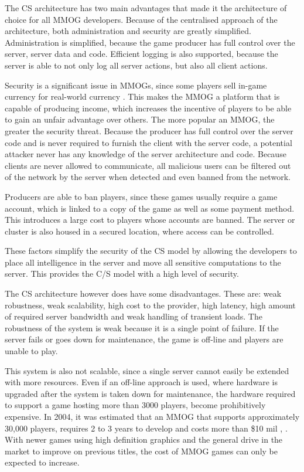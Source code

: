 \documentclass[journal,oneside,a4paper,onecolumn]{IEEEtran}
\begin{document}
The \ac{CS} architecture has two main advantages that made it the architecture of choice for all MMOG developers. Because of the centralised approach of the architecture, both administration and security are greatly simplified. Administration is simplified, because the game producer has full control over the server, server data and code. Efficient logging is also supported, because the server is able to not only log all server actions, but also all client actions.

Security is a significant issue in MMOGs, since some players sell in-game currency for real-world currency \cite{chinese_gold_farmer}. This makes the MMOG a platform that is capable of producing income, which increases the incentive of players to be able to gain an unfair advantage over others. The more popular an MMOG, the greater the security threat. Because the producer has full control over the server code and is never required to furnish the client with the server code, a potential attacker never has any knowledge of the server architecture and code. Because clients are never allowed to communicate, all malicious users can be filtered out of the network by the server when detected and even banned from the network.

Producers are able to ban players, since these games usually require a game account, which is linked to a copy of the game as well as some payment method. This introduces a large cost to players whose accounts are banned. The server or cluster is also housed in a secured location, where access can be controlled.

These factors simplify the security of the \ac{CS} model by allowing the developers to place all intelligence in the server and move all sensitive computations to the server. This provides the C/S model with a high level of security.

The \ac{CS} architecture however does have some disadvantages. These are: weak robustness, weak scalability, high cost to the provider, high latency, high amount of required server bandwidth and weak handling of transient loads. The robustness of the system is weak because it is a single point of failure. If the server fails or goes down for maintenance, the game is off-line and players are unable to play.

This system is also not scalable, since a single server cannot easily be extended with more resources. Even if an off-line approach is used, where hardware is upgraded after the system is taken down for maintenance, the hardware required to support a game hosting more than 3000 players, become prohibitively expensive. In 2004, it was estimated that an MMOG that supports approximately 30,000 players, requires 2 to 3 years to develop and costs more than \$10 mil \cite{cs_mmog_cost}, \cite{igda_online_whitepaper}. With newer games using high definition graphics and the general drive in the market to improve on previous titles, the cost of MMOG games can only be expected to increase.
\end{document}

